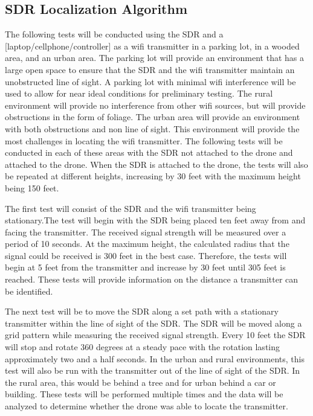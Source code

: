 \subsection{SDR Localization Algorithm}
The following tests will be conducted using the SDR and a [laptop/cellphone/controller] as a wifi transmitter in a parking lot, in a wooded area, and an urban area. The parking lot will provide an environment that has a large open space to ensure that the SDR and the wifi transmitter maintain an unobstructed line of sight. A parking lot with minimal wifi interference will be used to allow for near ideal conditions for preliminary testing. The rural environment will provide no interference from other wifi sources, but will provide obstructions in the form of foliage. The urban area will provide an environment with both obstructions and non line of sight. This environment will provide the most challenges in locating the wifi transmitter. The following tests will be conducted in each of these areas with the SDR not attached to the drone and attached to the drone. When the SDR is attached to the drone, the tests will also be repeated at different heights, increasing by 30 feet with the maximum height being 150 feet.\par 
The first test will consist of the SDR and the wifi transmitter being stationary.The test will begin with the SDR being placed ten feet away from and facing the transmitter. The received signal strength will be measured over a period of 10 seconds. At the maximum height, the calculated radius that the signal could be received is 300 feet in the best case. Therefore, the tests will begin at 5 feet from the transmitter and increase by 30 feet until 305 feet is reached. These tests will provide information on the distance a transmitter can be identified. \par 
The next test will be to move the SDR along a set path with a stationary transmitter within the line of sight of the SDR. The SDR will be moved along a grid pattern while measuring the received signal strength. Every 10 feet the SDR will stop and rotate 360 degrees at a steady pace with the rotation lasting approximately two and a half seconds. In the urban and rural environments, this test will also be run with the transmitter out of the line of sight of the SDR. In the rural area, this would be behind a tree and for urban behind a car or building. These tests will be performed multiple times and the data will be analyzed to determine whether the drone was able to locate the transmitter.\par 

